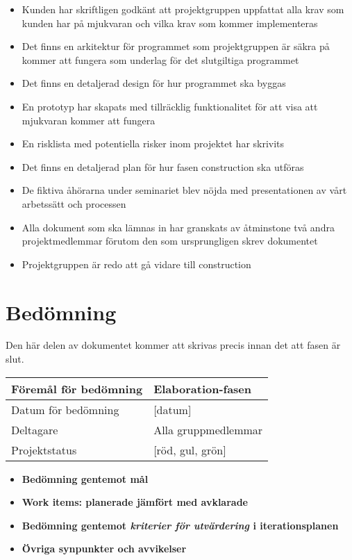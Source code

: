 \begin{itemize}
	\item Kunden har skriftligen godkänt att projektgruppen uppfattat alla krav som kunden har på mjukvaran och vilka krav som kommer implementeras 
	\item Det finns en arkitektur för programmet som projektgruppen är säkra på kommer att fungera som underlag för det slutgiltiga programmet
	\item Det finns en detaljerad design för hur programmet ska byggas
	\item En prototyp har skapats med tillräcklig funktionalitet för att visa att mjukvaran kommer att fungera
	\item En risklista med potentiella risker inom projektet har skrivits
	\item Det finns en detaljerad plan för hur fasen construction ska utföras
	\item De fiktiva åhörarna under seminariet blev nöjda med presentationen av vårt arbetssätt och processen
	\item Alla dokument som ska lämnas in har granskats av åtminstone två andra projektmedlemmar förutom den som ursprungligen skrev dokumentet
	\item Projektgruppen är redo att gå vidare till construction
\end{itemize}

\section{Bedömning}
Den här delen av dokumentet kommer att skrivas precis innan det att fasen är slut.

\begin{center}
	\begin{tabular}{| l | l |}
		\hline Föremål för bedömning & Elaboration-fasen \\
		\hline Datum för bedömning & [datum] \\
		\hline Deltagare & Alla gruppmedlemmar \\
		\hline Projektstatus & [röd, gul, grön] \\
		\hline
	\end{tabular}
\end{center}

\begin{itemize}
	\item \textbf{Bedömning gentemot mål}
	\item \textbf{Work items: planerade jämfört med avklarade}
	\item \textbf{Bedömning gentemot \textit{kriterier för utvärdering} i iterationsplanen}	
	\item \textbf{Övriga synpunkter och avvikelser}
\end{itemize}



